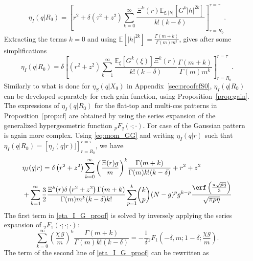 {{\begin{equation*}
    \eta_I(q|R_0)= \left[r^2+\delta\left(\tau^2+z^2\right) \sum\limits_{k=0}^{\infty} \frac{\Xi^k(r) \mathbb E_{\xi, |h|}\!\left[G^k |h|^{2k}\right]}{k! (k-\delta)}\right]_{r = R_0}^{r=\tau}\!.
\end{equation*}}
Extracting the terms $k=0$ and using $\mathbb E\left[|h|^{2k}\right] = \frac{\Gamma(m+k)}{\Gamma(m) m^k}$, gives after some simplifications
{\small
\begin{equation}\label{eta_I}
        \eta_I(q|R_0) = \delta\left[\left(r^2+z^2\right)\sum_{k=1}^\infty\frac{ \mathbb E_{\xi}\!\left[G^k(\xi)\right] \Xi^k(r)}{k!(k-\delta)} \frac{\Gamma(m+k)}{\Gamma(m) m^k} \right]_{r = R_0}^{r=\tau}\!.
\end{equation}}
Similarly to what is done for $\eta_S(q|X_0)$ in Appendix~\ref{sec:proofcfS0}, $\eta_I(q|R_0)$ can be developed separately for each gain function, using Proposition~\ref{prop:gain}. The expressions of $\eta_I(q|R_0)$ for the flat-top and multi-cos patterns in Proposition~\ref{prop:cf} are obtained by using the series expansion of the generalized hypergeometric function $_pF_q(\cdot;\cdot)$. For case of the Gaussian pattern is again more complex. Using \eqref{eq:mom_GG} and writing $\eta_I(q|r)$ such that  $\eta_I(q|R_0) = \left[\eta_I(q|r)]\right]_{r = R_0}^{r=\tau}$, we have
    {\footnotesize
    \begin{equation}\label{eta_I_G_proof}
    \begin{split}
        &\eta_I(q|r) = \delta\left(r^2+z^2\right) \sum\limits_{k = 0}^\infty \left(\frac{\Xi(r)g}{m}\right)^k  \!\frac{\Gamma(m+k)}{\Gamma(m) k! (k-\delta)}+r^2+z^2\\
        &+ \sum\limits_{k = 1}^\infty \frac{3}{2}\frac{\Xi^k(r)\delta\left(r^2+z^2\right)\Gamma(m+k)}{\Gamma(m) m^k(k-\delta)k!} \sum\limits_{p = 1}^k \! \binom{k}{p} (N-g)^p g^{k-p} \frac{\erf\left(\tfrac{\pi \sqrt{p \eta}}{3}\right)}{\sqrt{\pi p \eta}}
    \end{split}
    \end{equation}}
The first term in \eqref{eta_I_G_proof} is solved by inversely applying the series expansion of ${}_2F_1(\cdot;\cdot;\cdot)$:
\begin{equation*}
    \sum\limits_{k = 0}^\infty \left(\frac{\chi\,g}{m}\right)^k  \frac{\Gamma(m+k)}{\Gamma(m) k! (k-\delta)} = -\frac{1}{\delta} {}_2F_1(-\delta,m;1-\delta;\frac{\chi g}{m}).
\end{equation*}
The term of the second line of \eqref{eta_I_G_proof} can be rewritten as
\begin{align}\label{eta_I_G_proof2}

\end{align}}
